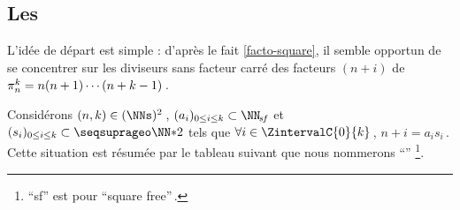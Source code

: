 

\subsection{Les \sftab[x]}

\leavevmode
\smallskip

L'idée de départ est simple : d'après le fait \ref{facto-square}, il semble opportun de se concentrer sur les diviseurs sans facteur carré des facteurs $(n + i)$ de $\consprod = n (n + 1) \cdots (n + k - 1)$\,.




\begin{defi}
	Considérons $(n, k) \in ( \NNs )^2$\,,
	$( a_i )_{0 \leq i \leq k} \subset \NNsf$
	et
	$( s_i )_{0 \leq i \leq k} \subset \NNssquare$
	tels que
	$\forall i \in \ZintervalC{0}{k}$\,, $n + i = a_i s_i$\,.
	Cette situation est résumée par le tableau suivant que nous nommerons \enquote{\sftab}
	\footnote{
		\enquote{sf} est pour \enquote{square free}\,.
	}.

	\begin{center}
	\end{center}
\end{defi}




